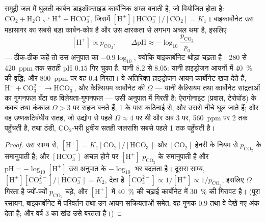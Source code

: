 \begin{theorem}[अम्लीकरण]\label{thm:b2:global-change:acid}
समुद्री जल में घुलती कार्बन डाइऑक्साइड कार्बोनिक अम्ल बनाती है, जो
वियोजित होता है: $\ensuremath{\mathrm{CO_2}} + \ensuremath{\mathrm{H_2O}} \rightleftharpoons \ensuremath{\mathrm{H^{+}}} +
\ensuremath{\mathrm{HCO_3^{-}}}$, जिसमें $[\ensuremath{\mathrm{H^{+}}}][\ensuremath{\mathrm{HCO_3^{-}}}]/[\ensuremath{\mathrm{CO_2}}] = K_1$।
बाइकार्बोनेट उस महासागर का सबसे बड़ा कार्बन-कोष है और उस क्षारकता से लगभग
अचल थमा है, इसलिए
\[
[\ensuremath{\mathrm{H^{+}}}] \propto p_{\ensuremath{\mathrm{CO_2}}}, \qquad
\Delta\mathrm{pH} \approx -\log_{10}\frac{p_{\ensuremath{\mathrm{CO_2}}}}{p_0}
\]
--- ठीक-ठीक कहें तो उस अनुपात का $-0.9\log_{10}$, क्योंकि बाइकार्बोनेट
थोड़ा चढ़ता है। 280 से \qty{420}{ppm} तक सतही pH
$0.15$ गिर चुका है, यानी $8.2$ से $8.05$: यानी हाइड्रोजन आयनों में \qty{40}{\%} की
वृद्धि; और \qty{800}{ppm} पर वह $0.4$ गिरता। वे अतिरिक्त हाइड्रोजन
आयन कार्बोनेट खपा देते हैं, $\ensuremath{\mathrm{H^{+}}} + \ensuremath{\mathrm{CO_3^{2-}}} \to \ensuremath{\mathrm{HCO_3^{-}}}$, और
कैल्सियम कार्बोनेट की \emph{} $\Omega$ ---
यानी कैल्सियम तथा कार्बोनेट सांद्रताओं का गुणनफल बँटा वह
विलेयता-गुणनफल --- उसी अनुपात में गिरती है: ऐरागोनाइट (प्रवाल, टेरोपॉड) के
कवच तथा कंकाल $\Omega > 3$ पर सहज बनते हैं, 1 के पास
कठिनाई से, और उससे नीचे घुल जाते हैं; और वह उष्णकटिबंधीय सतह,
जो उद्योग से पहले $\Omega \approx 4$ पर थी और अब 3 पर,
\qty{560}{ppm} पर 2 तक पहुँचती है, तथा ठंडी, \ensuremath{\mathrm{CO_2}}-भरी ध्रुवीय सतही जलराशि
सबसे पहले 1 तक पहुँचती है।
\end{theorem}
\begin{proof}
उस साम्य से, $[\ensuremath{\mathrm{H^{+}}}] = K_1[\ensuremath{\mathrm{CO_2}}]/[\ensuremath{\mathrm{HCO_3^{-}}}]$ और
$[\ensuremath{\mathrm{CO_2}}]$ हेनरी के नियम से $p_{\ensuremath{\mathrm{CO_2}}}$ के समानुपाती है;
और $[\ensuremath{\mathrm{HCO_3^{-}}}]$ अचल होने पर $[\ensuremath{\mathrm{H^{+}}}]$
$p_{\ensuremath{\mathrm{CO_2}}}$ के समानुपाती है और $\mathrm{pH} = -\log_{10}[\ensuremath{\mathrm{H^{+}}}]$ उस अनुपात के
$-\log_{10}$ भर बदलता है। दूसरा साम्य, $[\ensuremath{\mathrm{H^{+}}}][\ensuremath{\mathrm{CO_3^{2-}}}]/[\ensuremath{\mathrm{HCO_3^{-}}}]
= K_2$, देता है $[\ensuremath{\mathrm{CO_3^{2-}}}] \propto 1/[\ensuremath{\mathrm{H^{+}}}] \propto
1/p_{\ensuremath{\mathrm{CO_2}}}$, इसलिए $\Omega$ गिरता है ज्यों-ज्यों $p_{\ensuremath{\mathrm{CO_2}}}$ चढ़े, और
$[\ensuremath{\mathrm{H^{+}}}]$ में \qty{40}{\%} की चढ़ाई
कार्बोनेट में \qty{30}{\%} की गिरावट है। (पूरा रसायन, बाइकार्बोनेट में परिवर्तन तथा
उन आयन-सक्रियताओं समेत, वह गुणक $0.9$ तथा वे देखे गए
अंक देता है; और वर्ष 3 का खंड उसे बरतता है।)
\end{proof}
